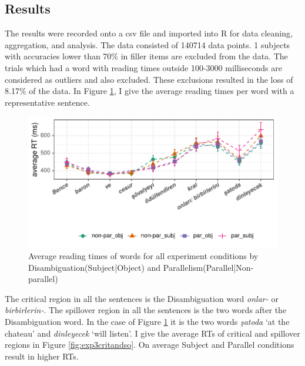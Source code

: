 \subsection{Results}

The results were recorded onto a csv file and imported into R \citep{team2013r} for data cleaning, aggregation, and analysis. The data consisted of 140714 data points. 1 subjects with accuracies lower than 70\% in filler items are excluded from the data. The trials which had a word with reading times outside 100-3000 milliseconds are considered as outliers and also excluded. These exclusions resulted in the loss of 8.17\% of the data. In Figure \ref{fig:exp3sentenceread}, I give the average reading times per word with a representative sentence.


\begin{knitrout}
\color{fgcolor}\begin{figure}[hbt!]

{\centering \includegraphics[]{experiments/equivalance/report/figure/exp3sentenceread-1.pdf} 

}

\caption[Average reading times of words for all experiment conditions by Disambiguation(Subject|Object) and Parallelism(Parallel|Non-parallel)]{Average reading times of words for all experiment conditions by Disambiguation(Subject|Object) and Parallelism(Parallel|Non-parallel)}\label{fig:exp3sentenceread}
\end{figure}


\end{knitrout}

The critical region in all the sentences is the Disambiguation word \textit{onlar-{\Case}} or \textit{birbirlerin-{\Case}}. The spillover region in all the sentences is the two words after the Disambiguation word. In the case of Figure \ref{fig:exp3sentenceread} it is the two words \textit{şatoda} `at the chateau' and \textit{dinleyecek} `will listen'. I give the average RTs of critical and spillover regions in Figure \ref{fig:exp3critandso}. On average Subject and Parallel conditions result in higher RTs.

